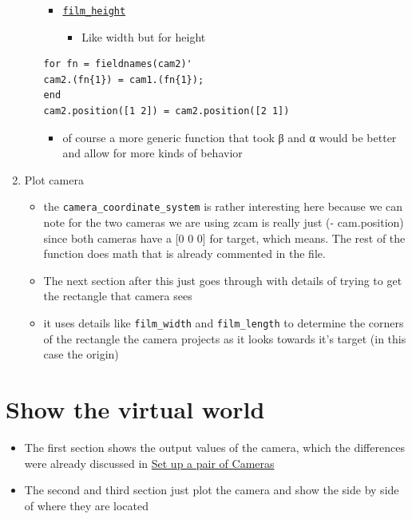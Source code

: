 \documentclass{article}
\begin{document}
\begin{enumerate}
\begin{itemize}
\begin{itemize}
\begin{itemize}
\end{itemize}
\item \uline{\texttt{film\_height}}
\begin{itemize}
\item Like width but for height
\end{itemize}
\end{itemize}
\begin{verbatim}
for fn = fieldnames(cam2)'
cam2.(fn{1}) = cam1.(fn{1});
end
cam2.position([1 2]) = cam2.position([2 1])
\end{verbatim}
\begin{itemize}
\item of course a more generic function that took β and α would be better
and allow for more kinds of behavior
\end{itemize}
\end{itemize}
\item Plot camera
\label{sec-2-4}
\begin{itemize}
\item the \texttt{camera\_coordinate\_system} is rather interesting here because we
can note for the two cameras we are using zcam is really just (-
cam.position) since both cameras have a [0 0 0] for target, which
means. The rest of the function does math that is already commented
in the file.
\item The next section after this just goes through with details of
trying to get the rectangle that camera sees
\item it uses details like \texttt{film\_width} and \texttt{film\_length} to determine the
corners of the rectangle the camera projects as it looks towards
it's target (in this case the origin)
\end{itemize}
\end{enumerate}
\section{Show the virtual world}
\label{sec-3}
\begin{itemize}
\item The first section shows the output values of the camera, which the
differences were already discussed in \hyperref[sec-2-3]{Set up a pair of Cameras}
\item The second and third section just plot the camera and show the side by
side of where they are located
\end{itemize}
\end{document}

